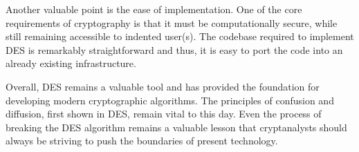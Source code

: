 \documentclass[conference]{IEEEtran}
\begin{document}
Another valuable point is the ease of implementation. One of the core requirements of cryptography is that it must be computationally secure, while still remaining accessible to indented user(s). The codebase required to implement DES is remarkably straightforward and thus, it is easy to port the code into an already existing infrastructure.

Overall, DES remains a valuable tool and has provided the foundation for developing modern cryptographic algorithms. The principles of confusion and diffusion, first shown in DES, remain vital to this day. Even the process of breaking the DES algorithm remains a valuable lesson that cryptanalysts should always be striving to push the boundaries of present technology. 



\end{document}

